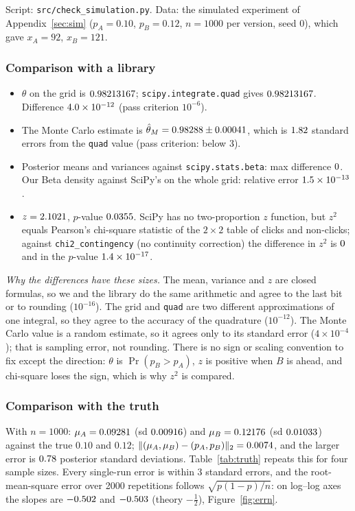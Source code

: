 \documentclass[11pt]{article}
\theoremstyle{definition}
\theoremstyle{remark}
\renewcommand{\Pr}{\operatorname{Pr}}
\newcommand{\simxA}{92}\newcommand{\simxB}{121}\newcommand{\simn}{1000}\newcommand{\simM}{100{,}000}}
\begin{document}
Script: \texttt{src/check\_simulation.py}. Data: the simulated experiment of Appendix~\ref{sec:sim} ($p_A=0.10$, $p_B=0.12$, $n=\simn$ per version, seed 0), which gave $x_A=\simxA$, $x_B=\simxB$.

\subsubsection{Comparison with a library}
\begin{itemize}[nosep]
\item $\theta$ on the grid is $0.98213167$; \texttt{scipy.integrate.quad} gives $0.98213167$. Difference $4.0\times10^{-12}$
  (pass criterion $10^{-6}$).
\item The Monte Carlo estimate is $\hat\theta_M=0.98288\pm0.00041$, which is $1.82$ standard errors from the
  \texttt{quad} value (pass criterion: below 3).
\item Posterior means and variances against \texttt{scipy.stats.beta}: max difference $0$. Our Beta density
  against SciPy's on the whole grid: relative error $1.5\times10^{-13}$.
\item $z=2.1021$, $p$-value $0.0355$. SciPy has no two-proportion $z$ function, but $z^2$ equals Pearson's chi-square
  statistic of the $2\times2$ table of clicks and non-clicks; against \texttt{chi2\_contingency} (no continuity
  correction) the difference in $z^2$ is $0$ and in the $p$-value $1.4\times10^{-17}$.
\end{itemize}
\emph{Why the differences have these sizes.} The mean, variance and $z$ are closed formulas, so we and the library
do the same arithmetic and agree to the last bit or to rounding ($10^{-16}$). The grid and \texttt{quad} are two
different approximations of one integral, so they agree to the accuracy of the quadrature ($10^{-12}$). The Monte
Carlo value is a random estimate, so it agrees only to its standard error ($4\times10^{-4}$); that is sampling
error, not rounding. There is no sign or scaling convention to fix except the direction: $\theta$ is
$\Pr(p_B>p_A)$, $z$ is positive when $B$ is ahead, and chi-square loses the sign, which is why $z^2$ is compared.

\subsubsection{Comparison with the truth}
With $n=\simn$: $\mu_A=0.09281$ (sd $0.00916$) and $\mu_B=0.12176$ (sd $0.01033$) against the true $0.10$ and $0.12$;
$\|(\mu_A,\mu_B)-(p_A,p_B)\|_2=0.0074$, and the larger error is $0.78$ posterior standard deviations.
Table~\ref{tab:truth} repeats this for four sample sizes. Every single-run error is within 3 standard errors, and
the root-mean-square error over 2000 repetitions follows $\sqrt{p(1-p)/n}$: on log--log axes the slopes are
$-0.502$ and $-0.503$ (theory $-\frac12$), Figure~\ref{fig:errn}.
\end{document}
